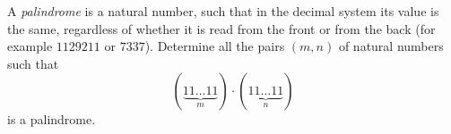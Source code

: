 A \emph{palindrome} is a natural number, such that in the decimal system its value is the same,
regardless of whether it is read from the front or from the back (for example $1129211$ or $7337$).
Determine all the pairs $(m,n)$ of natural numbers such that
$$(\underbrace{11\dots 11 }_{m})\cdot (\underbrace{11\dots 11}_{n})$$
is a palindrome.
